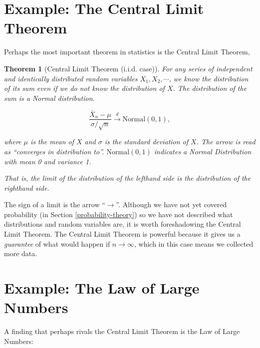 \documentclass[
]{book}
\newtheorem{theorem}{Theorem}[chapter]
\theoremstyle{definition}
\theoremstyle{definition}
\theoremstyle{definition}
\theoremstyle{definition}
\theoremstyle{remark}
\begin{document}
\hypertarget{example-the-central-limit-theorem}{%
\section*{Example: The Central Limit Theorem}\label{example-the-central-limit-theorem}}

Perhaps the most important theorem in statistics is the Central Limit Theorem,

\begin{theorem}[Central Limit Theorem (i.i.d. case)]
\protect\hypertarget{thm:clt-lim}{}{\label{thm:clt-lim} {} }For any series of independent and identically distributed random variables \(X_1, X_2, \cdots\), we know the distribution of its sum even if we do not know the distribution of \(X\). The distribution of the sum is a Normal distribution.

\[\frac{\bar{X}_n - \mu}{\sigma / \sqrt{n}} \xrightarrow{d} \text{Normal}(0, 1),\]

where \(\mu\) is the mean of \(X\) and \(\sigma\) is the standard deviation of \(X\). The arrow is read as ``converges in distribution to''. \(\text{Normal}(0, 1)\) indicates a Normal Distribution with mean 0 and variance 1.

That is, the limit of the distribution of the lefthand side is the distribution of the righthand side.
\end{theorem}

The sign of a limit is the arrow ``\(\rightarrow\)''. Although we have not yet covered probability (in Section \ref{probability-theory}) so we have not described what distributions and random variables are, it is worth foreshadowing the Central Limit Theorem. The Central Limit Theorem is powerful because it gives us a \emph{guarantee} of what would happen if \(n \rightarrow \infty\), which in this case means we collected more data.

\hypertarget{example-the-law-of-large-numbers}{%
\section*{Example: The Law of Large Numbers}\label{example-the-law-of-large-numbers}}

A finding that perhaps rivals the Central Limit Theorem is the Law of Large Numbers:
\end{document}
